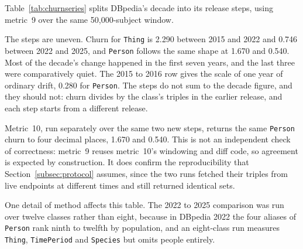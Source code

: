 Table~\ref{tab:churnseries} splits DBpedia's decade into its release steps,
using metric~9 over the same 50{,}000-subject window.

\begin{table}[htbp]
  \centering
  \caption[]{Churn for \texttt{owl:Thing} and
    \texttt{dbo:Person} across each DBpedia release step, from metric~9, with
    the added and deleted triples for \texttt{dbo:Person}. Each row divides by
    the class's triples in its own earlier release.}
  \label{tab:churnseries}
  \footnotesize
\end{table}

The steps are uneven. Churn for \texttt{Thing} is 2.290 between 2015 and 2022
and 0.746 between 2022 and 2025, and \texttt{Person} follows the same shape at
1.670 and 0.540. Most of the decade's change happened in the first seven years,
and the last three were comparatively quiet. The 2015 to 2016 row gives the
scale of one year of ordinary drift, 0.280 for \texttt{Person}. The steps do not
sum to the decade figure, and they should not: churn divides by the class's
triples in the earlier release, and each step starts from a different release.

Metric~10, run separately over the same two new steps, returns the same
\texttt{Person} churn to four decimal places, 1.670 and 0.540. This is not an
independent check of correctness: metric~9 reuses metric~10's windowing and
diff code, so agreement is expected by construction. It does confirm the
reproducibility that Section~\ref{subsec:protocol} assumes, since the two runs
fetched their triples from live endpoints at different times and still returned
identical sets.

One detail of method affects this table. The 2022 to 2025 comparison was run
over twelve classes rather than eight, because in DBpedia 2022 the four aliases
of \texttt{Person} rank ninth to twelfth by population, and an eight-class run
measures \texttt{Thing}, \texttt{TimePeriod} and \texttt{Species} but omits
people entirely.

